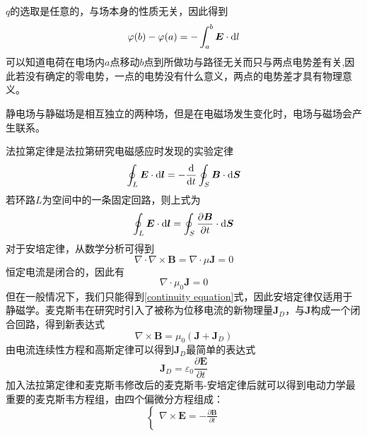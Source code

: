 \documentclass[UTF8,a4paper,10pt]{ctexart}
\begin{document}
\begin{multicols}{2}
\begin{equation}
        \end{equation}
        $q$的选取是任意的，与场本身的性质无关，因此得到
        \begin{equation}
            \varphi(b) - \varphi(a) = -\int_a^b\bm{E}\cdot{\rm d}l
        \end{equation}
        可以知道电荷在电场内$a$点移动$b$点到所做功与路径无关而只与两点电势差有关,因此若没有确定的零电势，一点的电势没有什么意义，两点的电势差才具有物理意义。\par
        静电场与静磁场是相互独立的两种场，但是在电磁场发生变化时，电场与磁场会产生联系。\par
        法拉第定律是法拉第研究电磁感应时发现的实验定律
        \begin{equation}
            \oint_L\bm{E}\cdot{\rm d}\bm{l} = -\frac{{\rm d}}{{\rm d}t}\oint_S\bm{B}\cdot{\rm d}\bm{S}
        \end{equation}
        若环路$L$为空间中的一条固定回路，则上式为
        \begin{equation}
            \oint_L\bm{E}\cdot{\rm d}\bm{l} = \oint_S\frac{\partial\bm{B}}{\partial t}\cdot{\rm d}\bm{S}
        \end{equation}
        对于安培定律，从数学分析可得到
        \begin{equation}
            \nabla\cdot\nabla\times\bm{B} = \nabla\cdot\mu\bm{J} = 0
        \end{equation}
        恒定电流是闭合的，因此有
        \begin{equation}
            \nabla\cdot\mu_0\bm{J} = 0
        \end{equation}
        但在一般情况下，我们只能得到\eqref{continuity equation}式，因此安培定律仅适用于静磁学。麦克斯韦在研究时引入了被称为位移电流的新物理量$\bm{J}_D$，与$\bm{J}$构成一个闭合回路，得到新表达式
        \begin{equation}
            \nabla\times\bm{B} = \mu_0(\bm{J}+\bm{J}_D)
        \end{equation}
        由电流连续性方程和高斯定律可以得到$\bm{J}_D$最简单的表达式
        \begin{equation}
            \bm{J}_D = \varepsilon_0\frac{\partial\bm{E}}{\partial t}
        \end{equation}
        加入法拉第定律和麦克斯韦修改后的麦克斯韦-安培定律后就可以得到电动力学最重要的麦克斯韦方程组，由四个偏微分方程组成：
        \begin{equation}\label{Maxwell's equations}
            \left\{\begin{array}{l}
                \nabla\times\bm{E} = -\frac{\partial\bm{B}}{\partial t}\\

\end{array}
\end{equation}
\end{multicols}
\end{document}
